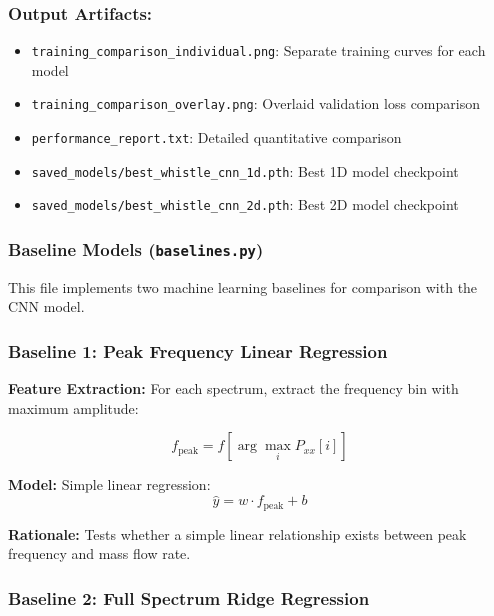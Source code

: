 \subsubsection{Output Artifacts:}
\begin{itemize}
    \item \verb|training_comparison_individual.png|: Separate training curves for each model
    \item \verb|training_comparison_overlay.png|: Overlaid validation loss comparison
    \item \verb|performance_report.txt|: Detailed quantitative comparison
    \item \verb|saved_models/best_whistle_cnn_1d.pth|: Best 1D model checkpoint
    \item \verb|saved_models/best_whistle_cnn_2d.pth|: Best 2D model checkpoint
\end{itemize}

\subsubsection{Baseline Models (\texttt{baselines.py})}

This file implements two machine learning baselines for comparison with the CNN model.

\subsubsection{Baseline 1: Peak Frequency Linear Regression}

\textbf{Feature Extraction:}
For each spectrum, extract the frequency bin with maximum amplitude:

\begin{equation}\label{peak_freq}
    f_{\text{peak}} = f[\arg\max_i P_{xx}[i]]
\end{equation}

\textbf{Model:}
Simple linear regression:
\begin{equation}\label{linear_reg}
    \hat{y} = w \cdot f_{\text{peak}} + b
\end{equation}

\textbf{Rationale:}
Tests whether a simple linear relationship exists between peak frequency and mass flow rate.

\subsubsection{Baseline 2: Full Spectrum Ridge Regression}

